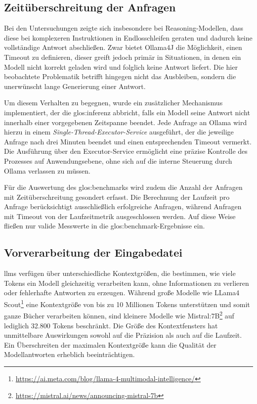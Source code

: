
\subsection{Zeitüberschreitung der Anfragen}\label{subsec:zeituberschreitung-der-anfragen}

Bei den Untersuchungen zeigte sich insbesondere bei Reasoning-Modellen, dass diese bei komplexeren Instruktionen in Endlosschleifen geraten und dadurch keine vollständige Antwort abschließen.
Zwar bietet Ollama4J die Möglichkeit, einen Timeout zu definieren, dieser greift jedoch primär in Situationen, in denen ein Modell nicht korrekt geladen wird und folglich keine Antwort liefert.
Die hier beobachtete Problematik betrifft hingegen nicht das Ausbleiben, sondern die unerwünscht lange Generierung einer Antwort.

Um diesem Verhalten zu begegnen, wurde ein zusätzlicher Mechanismus implementiert, der die \gls{glos:inferenz} abbricht, falls ein Modell seine Antwort nicht innerhalb einer vorgegebenen Zeitspanne beendet.
Jede Anfrage an Ollama wird hierzu in einem \textit{Single-Thread-Executor-Service} ausgeführt, der die jeweilige Anfrage nach drei Minuten beendet und einen entsprechenden Timeout vermerkt.
Die Ausführung über den Executor-Service ermöglicht eine präzise Kontrolle des Prozesses auf Anwendungsebene, ohne sich auf die interne Steuerung durch Ollama verlassen zu müssen.

Für die Auswertung des \gls{glos:benchmark}s wird zudem die Anzahl der Anfragen mit Zeitüberschreitung gesondert erfasst.
Die Berechnung der Laufzeit pro Anfrage berücksichtigt ausschließlich erfolgreiche Anfragen, während Anfragen mit Timeout von der Laufzeitmetrik ausgeschlossen werden.
Auf diese Weise fließen nur valide Messwerte in die \gls{glos:benchmark}-Ergebnisse ein.


\subsection{Vorverarbeitung der Eingabedatei}\label{subsec:vorverarbeitung-der-eingabedatei}

\glspl{llm} verfügen über unterschiedliche Kontextgrößen, die bestimmen, wie viele Tokens ein Modell gleichzeitig verarbeiten kann, ohne Informationen zu verlieren oder fehlerhafte Antworten zu erzeugen.
Während große Modelle wie LLama4 Scout\footnote{\url{https://ai.meta.com/blog/llama-4-multimodal-intelligence/}} eine Kontextgröße von bis zu 10 Millionen Tokens unterstützen und somit ganze Bücher verarbeiten können, sind kleinere Modelle wie Mistral:7B\footnote{\url{https://mistral.ai/news/announcing-mistral-7b}} auf lediglich 32.800 Tokens beschränkt.
Die Größe des Kontextfensters hat unmittelbare Auswirkungen sowohl auf die Präzision als auch auf die Laufzeit.
Ein Überschreiten der maximalen Kontextgröße kann die Qualität der Modellantworten erheblich beeinträchtigen\autocite{zhang_sinklora_2024}.

